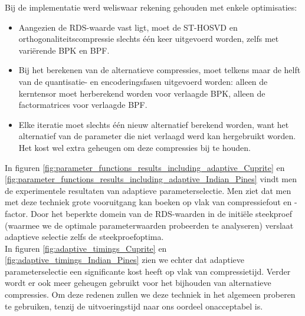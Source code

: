Bij de implementatie werd weliswaar rekening gehouden met enkele optimisaties:
\begin{itemize}
\item Aangezien de RDS-waarde vast ligt, moet de ST-HOSVD en orthogonaliteitscompressie slechts \'e\'en keer uitgevoerd worden, zelfs met vari\"erende BPK en BPF.
\item Bij het berekenen van de alternatieve compressies, moet telkens maar de helft van de quantisatie- en encoderingsfasen uitgevoerd worden: alleen de kerntensor moet herberekend worden voor verlaagde BPK, alleen de factormatrices voor verlaagde BPF.
\item Elke iteratie moet slechts \'e\'en nieuw alternatief berekend worden, want het alternatief van de parameter die niet verlaagd werd kan hergebruikt worden. Het kost wel extra geheugen om deze compressies bij te houden.
\end{itemize}

In figuren \ref{fig:parameter_functions_results_including_adaptive_Cuprite} en \ref{fig:parameter_functions_results_including_adaptive_Indian_Pines} vindt men de experimentele resultaten van adaptieve parameterselectie. Men ziet dat men met deze techniek grote vooruitgang kan boeken op vlak van compressiefout en -factor. Door het beperkte domein van de RDS-waarden in de initi\"ele steekproef (waarmee we de optimale parameterwaarden probeerden te analyseren) verslaat adaptieve selectie zelfs de steekproefoptima.\\

In figuren \ref{fig:adaptive_timings_Cuprite} en \ref{fig:adaptive_timings_Indian_Pines} zien we echter dat adaptieve parameterselectie een significante kost heeft op vlak van compressietijd. Verder wordt er ook meer geheugen gebruikt voor het bijhouden van alternatieve compressies. Om deze redenen zullen we deze techniek in het algemeen proberen te gebruiken, tenzij de uitvoeringstijd naar ons oordeel onacceptabel is.

